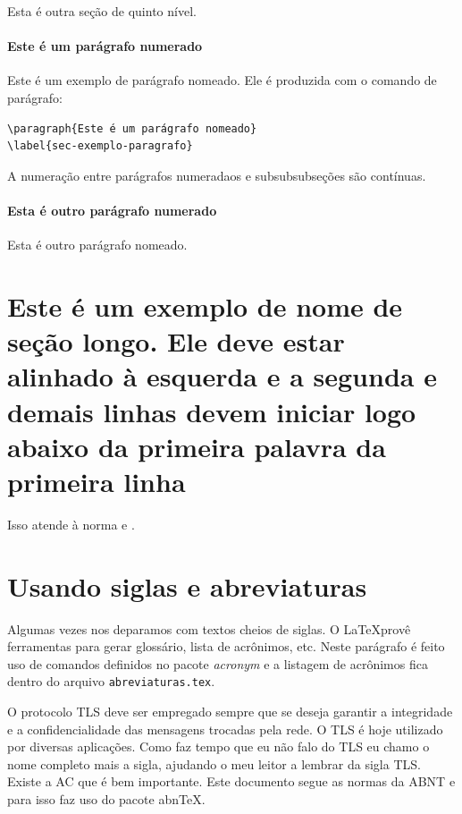 Esta é outra seção de quinto nível.


\paragraph{Este é um parágrafo numerado}\label{sec-exemplo-paragrafo}

Este é um exemplo de parágrafo nomeado. Ele é produzida com o comando de
parágrafo:

\begin{verbatim}
\paragraph{Este é um parágrafo nomeado}
\label{sec-exemplo-paragrafo}
\end{verbatim}

A numeração entre parágrafos numeradaos e subsubsubseções são contínuas.

\paragraph{Esta é outro parágrafo numerado}\label{sec-exemplo-paragrafo-outro}

Esta é outro parágrafo nomeado.

\section{Este é um exemplo de nome de seção longo. Ele deve estar
alinhado à esquerda e a segunda e demais linhas devem iniciar logo abaixo da
primeira palavra da primeira linha}

Isso atende à norma  
 e .


\section{Usando siglas e abreviaturas}

Algumas vezes nos deparamos com textos cheios de siglas. O \LaTeX provê ferramentas para gerar glossário, lista de acrônimos, etc. Neste parágrafo é feito uso de comandos definidos no pacote \textit{acronym} e a listagem de acrônimos fica dentro do arquivo \texttt{abreviaturas.tex}.

O protocolo \ac{TLS} deve ser empregado sempre que se deseja garantir a integridade e a confidencialidade das mensagens trocadas pela rede. O \ac{TLS} é hoje utilizado por diversas aplicações. Como faz tempo que eu não falo do \acf{TLS} eu chamo o nome completo mais a sigla, ajudando o meu leitor a lembrar da sigla \ac{TLS}. Existe a \ac{AC} que é bem importante. Este documento segue as normas da \ac{ABNT} e para isso faz uso do pacote \ac{abnTeX}.

